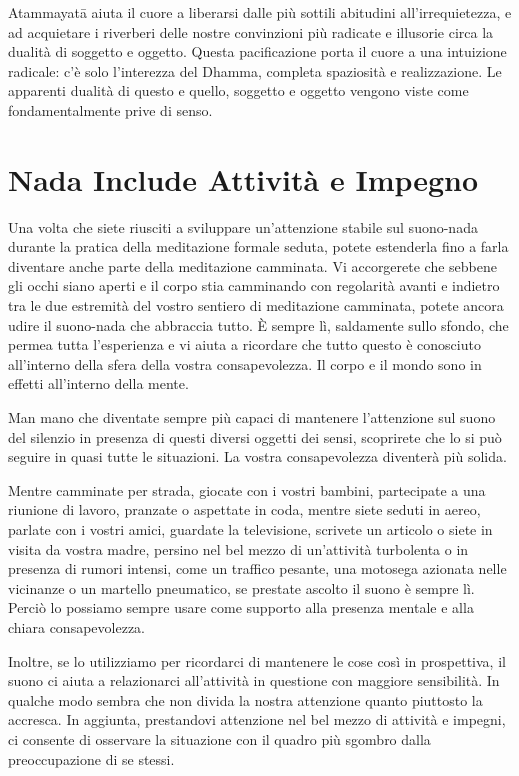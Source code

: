 Atammayatā aiuta il cuore a liberarsi dalle più sottili abitudini
all'irrequietezza, e ad acquietare i riverberi delle nostre convinzioni
più radicate e illusorie circa la dualità di soggetto e oggetto. Questa
pacificazione porta il cuore a una intuizione radicale: c'è solo
l'interezza del Dhamma, completa spaziosità e realizzazione. Le
apparenti dualità di questo e quello, soggetto e oggetto vengono viste
come fondamentalmente prive di senso.

\section{Nada Include Attività e Impegno}

Una volta che siete riusciti a sviluppare un'attenzione stabile sul
suono-nada durante la pratica della meditazione formale seduta, potete
estenderla fino a farla diventare anche parte della meditazione
camminata. Vi accorgerete che sebbene gli occhi siano aperti e il corpo
stia camminando con regolarità avanti e indietro tra le due estremità
del vostro sentiero di meditazione camminata, potete ancora udire il
suono-nada che abbraccia tutto. È sempre lì, saldamente sullo sfondo,
che permea tutta l'esperienza e vi aiuta a ricordare che tutto questo è
conosciuto all'interno della sfera della vostra consapevolezza. Il corpo
e il mondo sono in effetti all'interno della mente.

Man mano che diventate sempre più capaci di mantenere l'attenzione sul
suono del silenzio in presenza di questi diversi oggetti dei sensi,
scoprirete che lo si può seguire in quasi tutte le situazioni. La vostra
consapevolezza diventerà più solida.

Mentre camminate per strada, giocate con i vostri bambini, partecipate a
una riunione di lavoro, pranzate o aspettate in coda, mentre siete
seduti in aereo, parlate con i vostri amici, guardate la televisione,
scrivete un articolo o siete in visita da vostra madre, persino nel bel
mezzo di un'attività turbolenta o in presenza di rumori intensi, come un
traffico pesante, una motosega azionata nelle vicinanze o un martello
pneumatico, se prestate ascolto il suono è sempre lì. Perciò lo possiamo
sempre usare come supporto alla presenza mentale e alla chiara
consapevolezza.

Inoltre, se lo utilizziamo per ricordarci di mantenere le cose così in
prospettiva, il suono ci aiuta a relazionarci all'attività in questione
con maggiore sensibilità. In qualche modo sembra che non divida la
nostra attenzione quanto piuttosto la accresca. In aggiunta, prestandovi
attenzione nel bel mezzo di attività e impegni, ci consente di osservare
la situazione con il quadro più sgombro dalla preoccupazione di se
stessi.

